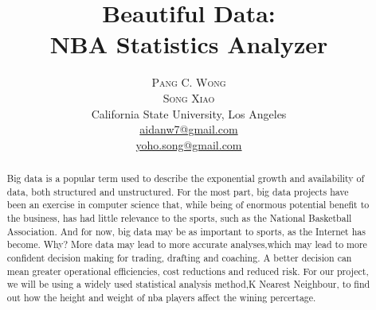 \documentclass[twoside]{article}
\title{\vspace{-15mm}\fontsize{24pt}{10pt}\selectfont\textbf{Beautiful Data: \\[2mm] NBA Statistics Analyzer}} %
\author{
\large
\textsc{Pang C. Wong}\\%
\textsc{Song Xiao}\\%
\normalsize California State University, Los Angeles \\[2mm] %
\normalsize \href{mailto:aidanw7@gmail.com}{aidanw7@gmail.com}\\ %
\normalsize \href{mailto:yoho.song@gmail.com}{yoho.song@gmail.com}\\ %
\vspace{-5mm}
}
\date{}
\begin{document}
\maketitle{} %

\thispagestyle{fancy} %


\begin{abstract}

\noindent Big data is a popular term used to describe the exponential growth and availability of data, both structured and unstructured. For the most part, big data projects have been an exercise in computer science that, while being of enormous potential benefit to the business, has had little relevance to the sports, such as the National Basketball Association. And for now, big data may be as important to sports, as the Internet has become. Why? More data may lead to more accurate analyses,which may lead to more confident decision making for trading, drafting and coaching. A better decision can mean greater operational efficiencies, cost reductions and reduced risk. For our project, we will be using a widely used statistical analysis method,K Nearest Neighbour, to find out how the height and weight of nba players affect the wining percertage.

\end{abstract}


\end{document}
